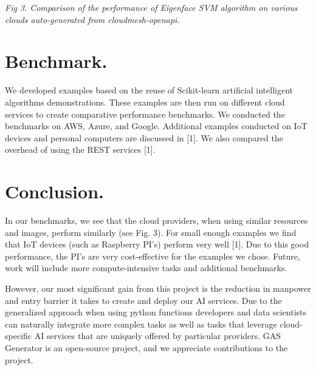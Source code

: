 \documentclass[letter,10pt]{article}
\begin{document}
\begin{multicols}{3}
\begin{center}
\end{center}

{\em Fig 3. Comparison of the performance of Eigenface SVM algorithm on various clouds auto-generated from cloudmesh-openapi.}

\section*{Benchmark.}

We developed examples based on the reuse of Scikit-learn artificial intelligent algorithms demonstrations. These examples are then run on different cloud services to create comparative performance benchmarks. We conducted the benchmarks on 
AWS, Azure, and Google. Additional examples conducted on IoT devices and personal computers are discussed in [1]. We also compared the overhead of using the REST services [1].


\section*{Conclusion.}

In our benchmarks, we see that the cloud providers, when using similar resources and images, perform similarly (see Fig. 3). For small enough examples we find that IoT devices (such as Raspberry PI's) perform very well [1]. Due to this good performance, the PI's are very cost-effective for the examples we chose.
Future, work will include more compute-intensive tasks and additional benchmarks.

However, our most significant gain from this project is the reduction in manpower and entry barrier it takes to create and deploy our AI services. Due to the generalized approach when using python functions developers and data scientists can naturally integrate more complex tasks as well as tasks that leverage cloud-specific AI services that are uniquely offered by particular providers. GAS Generator is an open-source project, and we appreciate contributions to the project. 


\end{multicols}
\end{document}
